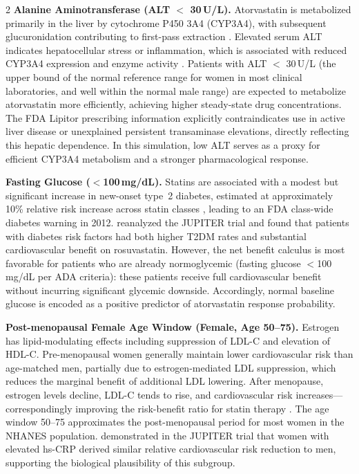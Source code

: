 \documentclass[12pt]{article}
\begin{document}
\begin{multicols}{2}
\textbf{Alanine Aminotransferase (ALT $<$ 30\,U/L).}
Atorvastatin is metabolized primarily in the liver by cytochrome P450 3A4
(CYP3A4), with subsequent glucuronidation contributing to first-pass
extraction \citep{lennernas2003clinical}.  Elevated serum ALT indicates
hepatocellular stress or inflammation, which is associated with reduced CYP3A4
expression and enzyme activity \citep{shitara2006pharmacokinetic}.  Patients
with ALT $<$ 30\,U/L (the upper bound of the normal reference range for women
in most clinical laboratories, and well within the normal male range) are
expected to metabolize atorvastatin more efficiently, achieving higher
steady-state drug concentrations.  The FDA Lipitor prescribing information
explicitly contraindicates use in active liver disease or unexplained
persistent transaminase elevations, directly reflecting this hepatic
dependence.  In this simulation, low ALT serves as a proxy for efficient
CYP3A4 metabolism and a stronger pharmacological response.

\textbf{Fasting Glucose ($<$100\,mg/dL).}
Statins are associated with a modest but significant increase in new-onset
type~2 diabetes, estimated at approximately 10\% relative risk increase
across statin classes \citep{sattar2010statins}, leading to an FDA class-wide
diabetes warning in 2012.  \citet{ridker2012benefits} reanalyzed the JUPITER
trial and found that patients with diabetes risk factors had both higher T2DM
rates and substantial cardiovascular benefit on rosuvastatin.  However, the
net benefit calculus is most favorable for patients who are already
normoglycemic (fasting glucose $<$100\,mg/dL per ADA criteria): these
patients receive full cardiovascular benefit without incurring significant
glycemic downside.  Accordingly, normal baseline glucose is encoded as a
positive predictor of atorvastatin response probability.

\textbf{Post-menopausal Female Age Window (Female, Age 50--75).}
Estrogen has lipid-modulating effects including suppression of LDL-C and
elevation of HDL-C.  Pre-menopausal women generally maintain lower
cardiovascular risk than age-matched men, partially due to
estrogen-mediated LDL suppression, which reduces the marginal benefit of
additional LDL lowering.  After menopause, estrogen levels decline, LDL-C
tends to rise, and cardiovascular risk increases---correspondingly improving
the risk-benefit ratio for statin therapy \citep{mora2010statins}.  The
age window 50--75 approximates the post-menopausal period for most women in
the NHANES population.  \citet{mora2010statins} demonstrated in the JUPITER
trial that women with elevated hs-CRP derived similar relative cardiovascular
risk reduction to men, supporting the biological plausibility of this
subgroup.


\end{multicols}
\end{document}
